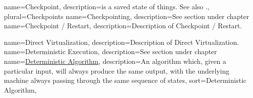 
\newcommand{\dvttermapi}{\dvtcmdabbrev{dvtglossapi}}
\newcommand{\dvttermabi}{\dvtcmdabbrev{dvtglossabi}}
\newcommand{\dvttermandroid}{Android}
\newcommand{\dvttermandroidsdk}{\dvttermandroid\ SDK}
\newcommand{\dvttermandroidemulator}{\dvttermandroid\ emulator}
\newcommand{\dvttermacm}{ACM}
\newcommand{\dvttermarm}{ARM}


{
  name=Checkpoint,
  description={is a saved state of things. See also \dvttermcheckpointing .},
  plural=Checkpoints
}
\newcommand{\dvttermcheckpoint}{\dvtcmdcaponce{Checkpoint}}
{
  name=Checkpointing,
  description={See section  under chapter }
}
\newcommand{\dvttermcheckpointing}{\dvtcmdcaponcegloss{dvtglosscheckpointing}{Checkpointing}}
\newcommand{\dvttermcpu}{\dvtcmdabbrev{dvtglosscpu}}
{
  name=Checkpoint / Restart,
  description={Description of Checkpoint / Restart.}
}
\newcommand{\dvttermcheckpointrestart}{\dvtcmdcaponcegloss{dvtglosscheckpointrestart}{Checkpoint / Restart}}
\newcommand{\dvttermcuda}{CUDA}
\newcommand{\dvttermc}{\texttt{C}}
\newcommand{\dvttermcplusplus}{\texttt{C++}}
\newcommand{\dvttermcisco}{Cisco Systems, Inc.}


{
  name=Direct Virtualization,
  description={Description of Direct Virtualization.}
}
\newcommand{\dvttermdirectvirtualization}{\dvtcmdcaponcegloss{dvtglossdirectvirtualization}{Direct Virtualization}}
\newcommand{\dvttermdirectx}{DirectX}
{
  name=Deterministic Execution,
  description={See section  under chapter }
}
\newcommand{\dvttermdeterministicexecution}{\dvtcmdcaponcegloss{dvtglossdeterministicexecution}{Deterministic Execution}}
{
  name=\href{http://en.wikipedia.org/wiki/Deterministic_algorithm}{Deterministic Algorithm},
  description={An algorithm which, given a particular input, will always produce the same output, with the underlying machine always passing through the same sequence of states},
  sort={Deterministic Algorithm},
}
\newcommand{\dvttermdeterministicalgorithm}{\dvtcmdcaponcegloss{dvtglossdeterministicalgorithm}{Deterministic Algorithm}}


